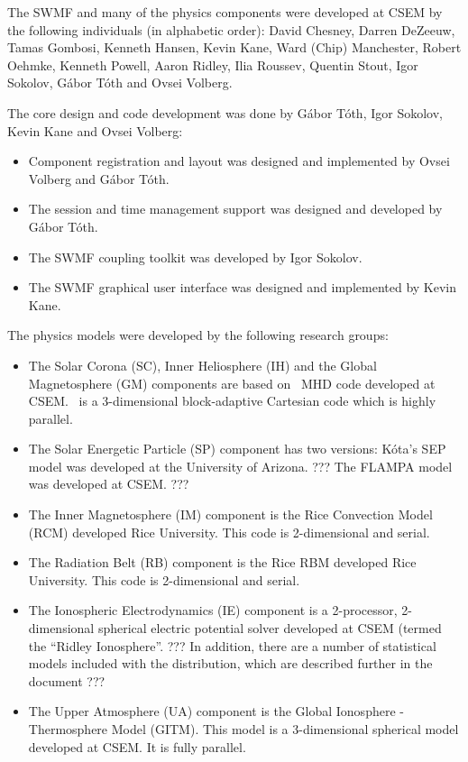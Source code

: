 The SWMF and many of the physics components were developed at CSEM
by the following individuals (in alphabetic order):
David Chesney,
Darren DeZeeuw, Tamas Gombosi, Kenneth Hansen, Kevin Kane, Ward (Chip)
Manchester, Robert Oehmke, Kenneth Powell, Aaron Ridley, Ilia Roussev,
Quentin Stout, Igor Sokolov, G\'abor T\'oth and Ovsei Volberg.

The core design and code development was done by G\'abor
T\'oth, Igor Sokolov, Kevin Kane and Ovsei Volberg:
\begin{itemize}
\item Component registration and layout was designed and implemented by 
      Ovsei Volberg and G\'abor T\'oth.
\item The session and time management support was designed and
      developed by G\'abor T\'oth.
\item The SWMF coupling toolkit was developed by Igor Sokolov.
\item The SWMF graphical user interface was designed and implemented
      by Kevin Kane.
\end{itemize}
The physics models were developed by the following research groups:
\begin{itemize}
\item
The Solar Corona (SC), Inner Heliosphere (IH) and the Global Magnetosphere 
(GM) components are based on \BATSRUS\ MHD code developed at CSEM. 
\BATSRUS\ is a 3-dimensional block-adaptive Cartesian code which is 
highly parallel.

\item
The Solar Energetic Particle (SP) component has two versions:
K\'ota's SEP model was developed at the University of Arizona.
???
The FLAMPA model was developed at CSEM.
???

\item
The Inner Magnetosphere (IM) component is the Rice Convection Model
(RCM) developed Rice University.  This code is 2-dimensional and
serial.

\item
The Radiation Belt (RB) component is the Rice RBM
developed Rice University.  This code is 2-dimensional and
serial.

\item
The Ionospheric Electrodynamics (IE) component is a 2-processor,
2-dimensional spherical electric potential solver developed at CSEM
(termed the ``Ridley Ionosphere''.  
???
In addition, there are a number of
statistical models included with the distribution, which are described
further in the document ???

\item
The Upper Atmosphere (UA) component is the Global Ionosphere -
Thermosphere Model (GITM).  This model is a 3-dimensional spherical
model developed at CSEM.  It is fully parallel.

\end{itemize}

